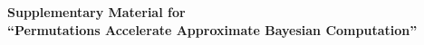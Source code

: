 \documentclass[12pt]{article}
\date{}
\theoremstyle{remark}
\theoremstyle{plain}
\begin{document}
\def\spacingset#1{\renewcommand{\baselinestretch}%
{#1}\small\normalsize} \spacingset{1}

\begin{center}
{\LARGE\bf Supplementary Material for\\[6pt]
``Permutations Accelerate Approximate Bayesian Computation''}
\end{center}

\bigskip

\spacingset{1.8}

\setcounter{section}{0}
\renewcommand{\thesection}{S.\arabic{section}}
\renewcommand{\theequation}{S.\arabic{equation}}
\renewcommand{\thefigure}{S.\arabic{figure}}
\renewcommand{\thetable}{S.\arabic{table}}




\end{document}
